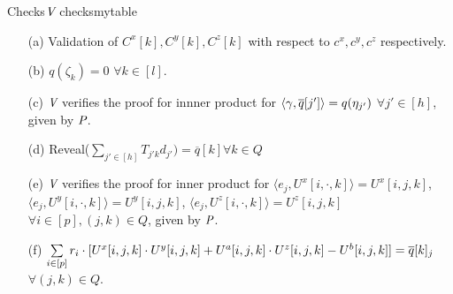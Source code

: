 \begin{algobox}{Checks}{$\V$ checks}{mytable}
	\begin{itemize}
		\item[(a)] Validation of $C^x[k], C^y[k], C^z[k]$ with respect to $c^x, c^y, c^z$ respectively. 
		\item[(b)] $q(\zeta_k)=0$ $\forall k\in [l]$.
		\item[(c)] $\V$ verifies the proof for innner product for $\langle \gamma,\oq[j'] \rangle = q(\eta_{j'})$ $\forall j'\in [h]$, given by $\P$.
		\item[(d)] Reveal($\sum\limits_{j'\in [h]} T_{j'k} d_{j'})=\overline{q}[k] \forall k\in Q$
		\item[(e)] $\V$ verifies the proof for inner product for $\langle e_j, U^x[i,\cdot,k]\rangle = U^x[i,j,k]$, $\langle e_j, U^y[i,\cdot,k]\rangle = U^y[i,j,k]$, $\langle e_j, U^z[i,\cdot,k]\rangle = U^z[i,j,k]$ $\forall i\in [p], (j,k)\in Q$, given by $\P$.
		\item[(f)] $\sum\limits_{i\in[p]} r_{i}\cdot [U^x[i,j,k]\cdot U^y[i,j,k]+ U^a[i,j,k]\cdot U^z[i,j,k] - U^b[i,j,k]]=\oq[k]_j$ $\forall (j,k)\in Q$.
	\end{itemize}
\end{algobox}

